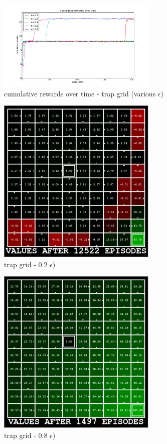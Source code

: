 \documentclass{sig-alternate}
\begin{document}
\begin{figure}[!htbp]
    \centering
    \includegraphics[width=3in]{images/trap/q-epsilon.pdf}
    \caption{cumulative rewards over time - trap grid (various $\epsilon$) \label{trap-q-epsilon}}
\end{figure} 

\begin{figure}[!htbp]
    \centering
    \includegraphics[width=3in]{images/trap/e02.pdf}
    \caption{trap grid - 0.2 $\epsilon$) \label{trap-e02}}
\end{figure} 

\begin{figure}[!htbp]
    \centering
    \includegraphics[width=3in]{images/trap/e08.pdf}
    \caption{trap grid - 0.8 $\epsilon$) \label{trap-e08}}
\end{figure} 
\end{document}

